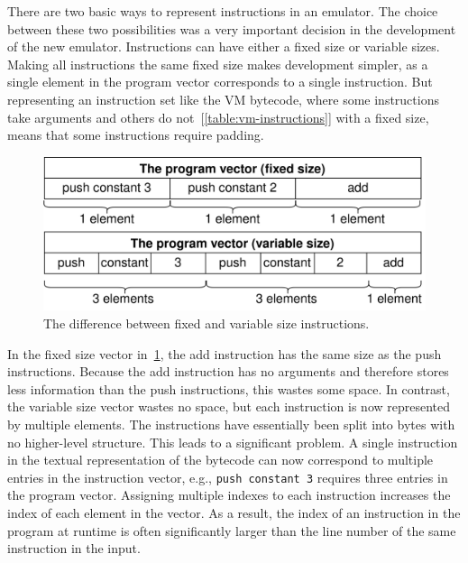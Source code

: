 There are two basic ways to represent instructions in an emulator.
The choice between these two possibilities was a very important decision in the development of the new emulator.
Instructions can have either a fixed size or variable sizes.
Making all instructions the same fixed size makes development simpler, as a single element in the program vector corresponds to a single instruction.
But representing an instruction set like the VM bytecode, where some instructions take arguments and others do not~[\ref{table:vm-instructions}] with a fixed size, means that some instructions require padding.
\begin{center}
  \begin{figure}[ht]
    \centering
    \includegraphics[width=12cm]{fig/instruction-size.png}
    \caption{The difference between fixed and variable size instructions.}
    \label{fig:instruction-size}
  \end{figure}
\end{center}
In the fixed size vector in~\cref{fig:instruction-size}, the add instruction has the same size as the push instructions.
Because the add instruction has no arguments and therefore stores less information than the push instructions, this wastes some space.
In contrast, the variable size vector wastes no space, but each instruction is now represented by multiple elements.
The instructions have essentially been split into bytes with no higher-level structure.
This leads to a significant problem.
A single instruction in the textual representation of the bytecode can now correspond to multiple entries in the instruction vector, e.g., \verb+push constant 3+ requires three entries in the program vector.
Assigning multiple indexes to each instruction increases the index of each element in the vector.
As a result, the index of an instruction in the program at runtime is often significantly larger than the line number of the same instruction in the input.
